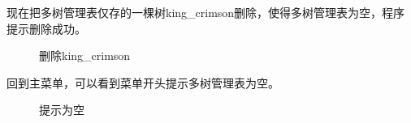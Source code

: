 \documentclass[supercite]{Experimental_Report}
\theoremstyle{definition}
\begin{document}
\clearpage
\noindent
现在把多树管理表仅存的一棵树king\_crimson删除，使得多树管理表为空，程序提示删除成功。
\begin{figure}[htbp]
	\centering
	\centering
	\caption{删除king\_crimson}
	\label{fig5-99}
\end{figure}

\noindent
回到主菜单，可以看到菜单开头提示多树管理表为空。
\begin{figure}[htbp]
	\centering
	\centering
	\caption{提示为空}
	\label{fig5-100}
\end{figure}
\end{document}
